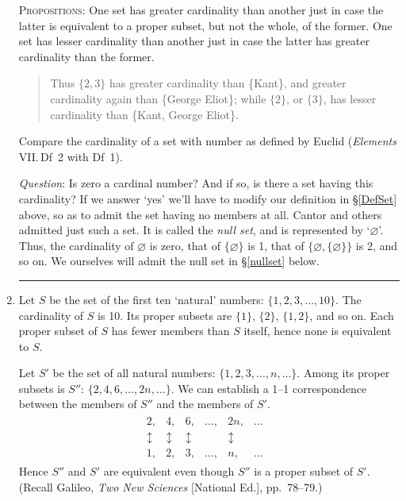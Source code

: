 \documentclass[polutonikogreek,english,twoside,openright]{article}
\begin{document}
\begin{enumerate}
  \textsc{Propositions}\label{greatercardinality}: One set has greater
  cardinality than another just in case the latter is equivalent to a
  proper subset, but not the whole, of the former. One set has lesser
  cardinality than another just in case the latter has greater
  cardinality than the former.

  \begin{quote} {\small Thus $\{2,3\}$ has greater cardinality than
      \{Kant\}, and greater cardinality again than \{George Eliot\};
      while $\{2\}$, or $\{3\}$, has lesser cardinality than \{Kant,
      George Eliot\}.  }\end{quote}

  Compare the cardinality of a set with number as defined by Euclid
  (\emph{Elements} VII.\,Df~2 with Df~1).

  \emph{Question}: Is zero a cardinal number? And if so, is there a
  set having this cardinality? If we answer `yes' we'll have to modify
  our definition in \S\ref{DefSet} above, so as to admit the set
  having no members at all. Cantor and others admitted just such a
  set. It is called the \emph{null set}, and is represented by
  `$\varnothing$'. Thus, the cardinality of $\varnothing$ is zero,
  that of $\{\varnothing\}$ is 1, that of
  $\{\varnothing, \{\varnothing\}\}$ is 2, and so on. We ourselves
  will admit the null set in \S\ref{nullset} below.\label{prefnullset}

  \noindent\rule[0.7ex]{\linewidth}{0.5pt}

\item Let $S$ be the set of the first ten `natural' numbers:
  $\{1,2,3,\dotsc,10\}$. The cardinality of $S$ is 10. Its proper
  subsets are $\{1\}$, $\{2\}$, $\{1,2\}$, and so on. Each proper
  subset of $S$ has fewer members than $S$ itself, hence none is
  equivalent to $S$.

  Let $S'$ be the set of all natural numbers:
  $\{1,2,3,\dotsc,n,\dotsc\}$. Among its proper subsets is $S''$:
  $\{2,4,6,\dotsc,2n,\dotsc\}$. We can establish a 1--1 correspondence
  between the members of $S''$ and the members of $S'$.
  \begin{align*}
    \begin{matrix}
      2,&4,&6,&\dotsc,&2n,&\dotsc\\
      \updownarrow\, &\updownarrow\, & \updownarrow\, & & \updownarrow\, & &\\
      1,&2,&3,&\dotsc,&n,&\dotsc
    \end{matrix}
  \end{align*}
  Hence $S''$ and $S'$ are equivalent even though $S''$ is a proper
  subset of $S'$. (Recall Galileo, \emph{Two New Sciences} [National
  Ed.], pp.~78--79.)


\end{enumerate}
\end{document}
